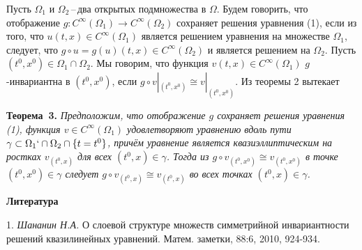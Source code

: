 \documentclass[a5paper, 12pt, openbib]{report}
\begin{document}
Пусть $\Omega_1$ и $\Omega_2$\,--\,два открытых подмножества в $\Omega$.
Будем говорить, что отображение
$g:C^{\infty}(\Omega_1)\to C^{\infty}(\Omega_2)$
сохраняет решения уравнения (1),
если из того, что $u(t,x)\in C^{\infty}(\Omega_1)$ является решением уравнения
на множестве $\Omega_1$, следует, что $g\circ u=g(u)(t,x)\in C^{\infty}(\Omega_2)$
и является решением на $\Omega_2$. Пусть $(t^0,x^0)\in \Omega_1\cap\Omega_2$.
Мы говорим, что функция $v(t,x)\in C^{\infty}(\Omega_1)$ $g$-инвариантна в $(t^0,x^0)$, если  $g\circ v|_{(t^0,x^0)}\cong v|_{(t^0,x^0)}$. Из теоремы 2
вытекает

\textbf{Теорема~3.} {\it 
Предположим, что отображение $g$ сохраняет решения уравнения {\rm (1)},
функция $v\in C^{\infty}(\Omega_1)$ удовлетворяют уравнению вдоль пути $\gamma\subset\Omega_1`\cap\Omega_2\cap\{t=t^0\}$, причём  уравнение
является квазиэллиптическим на ростках  $v_{(t^0,x)}$ для всех $(t^0,x)\in\gamma$. Тогда из $g\circ v_{(t^0,x^0)}\cong v_{(t^0,x^0)}$ в точке
$(t^0,x^0)\in\gamma$ следует $g\circ v_{(t^0,x)}\cong v_{(t^0,x)}$ во всех точках
$(t^0,x)\in\gamma$.
}




\smallskip \centerline {\bf Литература} \nopagebreak

1. {\it Шананин Н.А.} О слоевой структуре множеств симметрийной инвариантности решений квазилинейных уравнений. Матем. заметки, 88:6, 2010, 924-934.
\end{document}
